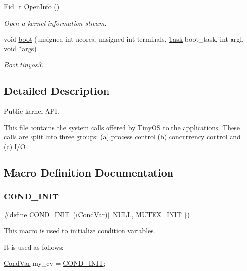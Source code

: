 \begin{DoxyCompactItemize}
\hyperlink{group__syscalls_ga5097222c5f0da97d92d4712359abc38f}{Fid\+\_\+t} \hyperlink{group__syscalls_gaf326b11574cdc84a9e21b9d860076821}{Open\+Info} ()
\begin{DoxyCompactList}\small\item\em Open a kernel information stream. \end{DoxyCompactList}\item 
void \hyperlink{group__syscalls_ga31d9ee7df9665928617a9f9c0cc6d361}{boot} (unsigned int ncores, unsigned int terminals, \hyperlink{group__syscalls_gaec3f2f835e105271fbbc00272c0ba984}{Task} boot\+\_\+task, int argl, void $\ast$args)
\begin{DoxyCompactList}\small\item\em Boot tinyos3. \end{DoxyCompactList}\end{DoxyCompactItemize}


\subsection{Detailed Description}
Public kernel A\+PI. 

This file contains the system calls offered by Tiny\+OS to the applications. These calls are split into three groups\+: (a) process control (b) concurrency control and (c) I/O 

\subsection{Macro Definition Documentation}
\mbox{\label{group__syscalls_ga6a7055a466bff255172e05f6ec82d792}} 
\subsubsection{\texorpdfstring{C\+O\+N\+D\+\_\+\+I\+N\+IT}{COND\_INIT}}
{\footnotesize\ttfamily \#define C\+O\+N\+D\+\_\+\+I\+N\+IT~((\hyperlink{structCondVar}{Cond\+Var})\{ N\+U\+LL, \hyperlink{group__syscalls_ga96be0bfc33e7e113099c7546798bec99}{M\+U\+T\+E\+X\+\_\+\+I\+N\+IT} \})}



This macro is used to initialize condition variables. 

It is used as follows\+: 
\begin{DoxyCode}
\hyperlink{structCondVar}{CondVar} my\_cv = \hyperlink{group__syscalls_ga6a7055a466bff255172e05f6ec82d792}{COND\_INIT};
\end{DoxyCode}
 

